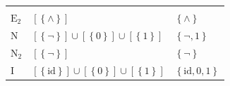 \documentclass[10pt,a4paper]{article}
\newcommand{\set}[1]{\left\{#1\right\}}
\newcommand{\clonefont}[1]{\mathrm{#1}}
\begin{document}
\begin{figure}[hbtp]
\begin{small}
\begin{longtable}[]{p{}p{}p{}}
\begin{minipage}[t]{0.38\columnwidth}
            \end{minipage}\tabularnewline
            \begin{minipage}[t]{0.12\columnwidth}\raggedright
                \(\clonefont{E_2}\)\strut
            \end{minipage} & \begin{minipage}[t]{0.41\columnwidth}\raggedright
                \([\set{\land}]\)\strut
            \end{minipage} & \begin{minipage}[t]{0.38\columnwidth}\raggedright
                \(\set{\land}\)\strut
            \end{minipage}\tabularnewline
            \begin{minipage}[t]{0.12\columnwidth}\raggedright
                \(\clonefont{N}\)\strut
            \end{minipage} & \begin{minipage}[t]{0.41\columnwidth}\raggedright
                \([\set{\neg}] \cup [\set{0}] \cup [\set{1}]\)\strut
            \end{minipage} & \begin{minipage}[t]{0.38\columnwidth}\raggedright
                \(\set{\neg, 1}\)\strut
            \end{minipage}\tabularnewline
            \begin{minipage}[t]{0.12\columnwidth}\raggedright
                \(\clonefont{N_2}\)\strut
            \end{minipage} & \begin{minipage}[t]{0.41\columnwidth}\raggedright
                \([\set{\neg}]\)\strut
            \end{minipage} & \begin{minipage}[t]{0.38\columnwidth}\raggedright
                \(\set{\neg}\)\strut
            \end{minipage}\tabularnewline
            \begin{minipage}[t]{0.12\columnwidth}\raggedright
                \(\clonefont{I}\)\strut
            \end{minipage} & \begin{minipage}[t]{0.41\columnwidth}\raggedright
                \([\set{\clonefont{id}}] \cup [\set{0}] \cup [\set{1}]\)\strut
            \end{minipage} & \begin{minipage}[t]{0.38\columnwidth}\raggedright
                \(\set{\clonefont{id}, 0, 1}\)\strut
            \end{minipage}\tabularnewline

\end{longtable}
\end{small}
\end{figure}
\end{document}
